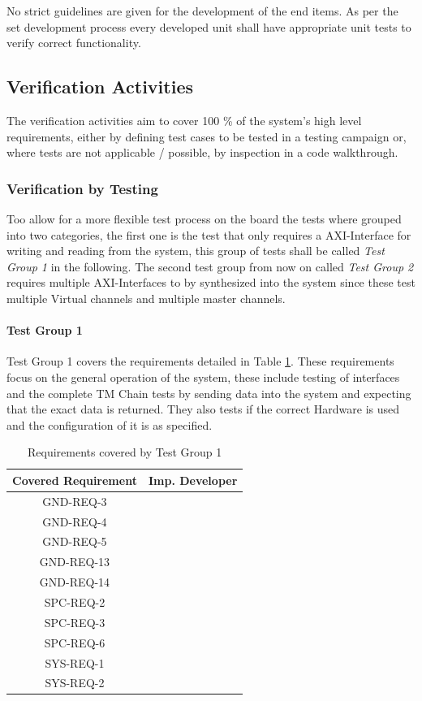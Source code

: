 No strict guidelines are given for the development of the end items. As per the set development process every developed unit shall have appropriate unit tests to verify correct functionality.

\subsection{Verification Activities}

The verification activities aim to cover 100 \% of the system's high level requirements, either by defining test cases to be tested in a testing campaign or, where tests are not applicable / possible, by inspection in a code walkthrough.

\subsubsection{Verification by Testing}
Too allow for a more flexible test process on the board the tests where grouped into two categories, the first one is the test that only requires a AXI-Interface for writing and reading from the system, this group of tests shall be called \textit{Test Group 1} in the following. The second test group from now on called \textit{Test Group 2} requires multiple AXI-Interfaces to by synthesized into the system since these test multiple Virtual channels and multiple master channels.
 
\paragraph{Test Group 1}

Test Group 1 covers the requirements detailed in Table \ref{tab:req_test_grp_1}. These requirements focus on the general operation of the system, these include testing of interfaces and the complete TM Chain tests by sending data into the system and expecting that the exact data is returned. They also tests if the correct Hardware is used and the configuration of it is as specified.

\begin{table}[h!]
	\begin{tabular}{|c|c|}
		\hline
		\textbf{Covered Requirement} & \textbf{Imp. Developer} \\
		\hline
		GND-REQ-3 & \\
		\hline
		GND-REQ-4 & \\
		\hline
		GND-REQ-5 & \\
		\hline
		GND-REQ-13 & \\
		\hline
		GND-REQ-14 & \\
		\hline
		SPC-REQ-2 & \\
		\hline
		SPC-REQ-3 & \\
		\hline
		SPC-REQ-6 & \\
		\hline
		SYS-REQ-1 & \\
		\hline
		SYS-REQ-2 & \\
		\hline
	\end{tabular}
	\caption{Requirements covered by Test Group 1}
	\label{tab:req_test_grp_1}
\end{table}

